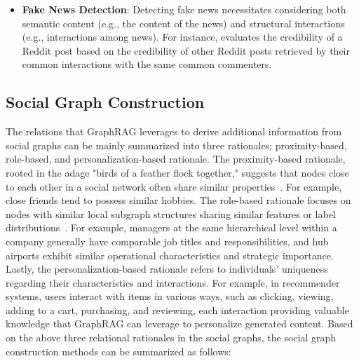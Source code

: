 \begin{itemize}[leftmargin=*]
    \item \textbf{Fake News Detection}: Detecting fake news necessitates considering both semantic content (e.g., the content of the news) and structural interactions (e.g., interactions among news). For instance, \citet{ram2024credirag} evaluates the credibility of a Reddit post based on the credibility of other Reddit posts retrieved by their common interactions with the same common commenters.
    
\end{itemize}


\subsection{Social Graph Construction}
The relations that GraphRAG leverages to derive additional information from social graphs can be mainly summarized into three rationales: proximity-based, role-based, and personalization-based rationale. The proximity-based rationale, rooted in the adage "birds of a feather flock together," suggests that nodes close to each other in a social network often share similar properties~\cite{mcpherson2001birds}. For example, close friends tend to possess similar hobbies. The role-based rationale focuses on nodes with similar local subgraph structures sharing similar features or label distributions~\cite{donnat2018learning}. For example, managers at the same hierarchical level within a company generally have comparable job titles and responsibilities, and hub airports exhibit similar operational characteristics and strategic importance. Lastly, the personalization-based rationale refers to individuals' uniqueness regarding their characteristics and interactions. For example, in recommender systems, users interact with items in various ways, such as clicking, viewing, adding to a cart, purchasing, and reviewing, each interaction providing valuable knowledge that GraphRAG can leverage to personalize generated content. Based on the above three relational rationales in the social graphs, the social graph construction methods can be summarized as follows:

